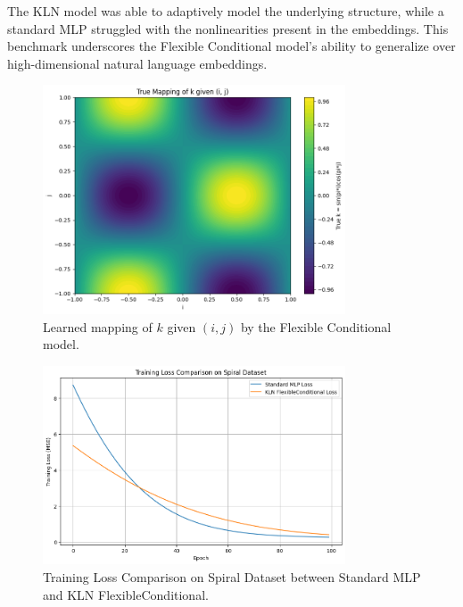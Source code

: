 \documentclass[11pt]{article}
\begin{document}
The KLN model was able to adaptively model the underlying structure, while a standard MLP struggled with the nonlinearities present in the embeddings. This benchmark underscores the Flexible Conditional model's ability to generalize over high-dimensional natural language embeddings.

\begin{figure}[h]
\centering
\includegraphics[width=0.8\textwidth]{figures/example_contour.png}
\caption{Learned mapping of $k$ given $(i, j)$ by the Flexible Conditional model.}
\label{fig:contour}
\end{figure}

\begin{figure}[h]
\centering
\includegraphics[width=0.8\textwidth]{figures/spiral_training_loss.png}
\caption{Training Loss Comparison on Spiral Dataset between Standard MLP and KLN FlexibleConditional.}
\label{fig:spiral_loss}
\end{figure}
\end{document}
